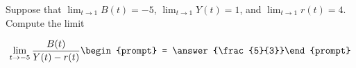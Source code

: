 \documentclass{ximera}
\author{Matthew Carr}
\begin{document}
\begin{exercise}
Suppose that $\lim_{t\to1}B(t)=-5$, $\lim_{t\to1}Y(t)=1$, and $\lim_{t\to1}r(t)=4$. Compute the limit

\[
\lim_{t\to -5 } \frac{B(t)}{Y(t)-r(t)}\begin{prompt} = \answer{\frac{5}{3}}\end{prompt}
\]
\end{exercise}
\end{document}
